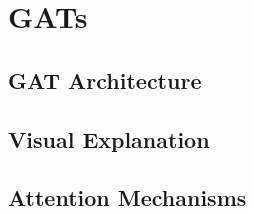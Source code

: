 \documentclass[aspectratio=169]{beamer}
\begin{document}
\section{GATs}
\subsection{GAT Architecture}
\subsection{Visual Explanation}
\subsection{Attention Mechanisms}
\end{document}
